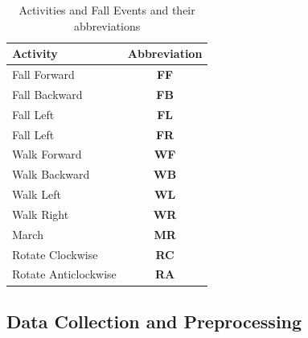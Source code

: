 \documentclass{IEEEtran}
\begin{document}
\begin{table}[htb]
\caption{Activities and Fall Events and their abbreviations}
\centering
{
\begin{tabular}{|l|c|}
\hline
\textbf{Activity} & \textbf{Abbreviation} \\  \hline
Fall Forward &\textbf{FF} \\ \hline
Fall Backward &\textbf{FB}  \\ \hline
Fall Left &\textbf{FL}  \\ \hline
Fall Left &\textbf{FR}  \\ \hline \hline
Walk Forward &\textbf{WF} \\ \hline
Walk Backward &\textbf{WB} \\ \hline
Walk Left &\textbf{WL} \\ \hline
Walk Right &\textbf{WR}  \\ \hline
March &\textbf{MR}  \\ \hline
Rotate Clockwise &\textbf{RC} \\ \hline
Rotate Anticlockwise&\textbf{RA}  \\ \hline
\end{tabular}
}
\label{Tbl:ListOfActivities}
\end{table}
 


\subsection{Data Collection and Preprocessing  }
\label{subsec:preDataCollection}
\end{document}
